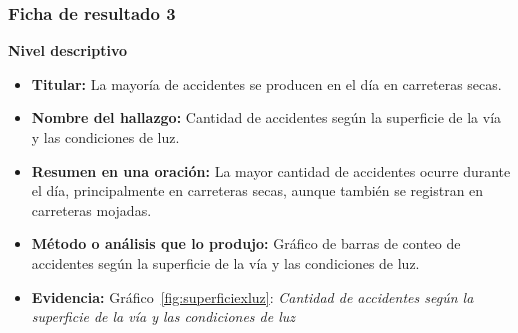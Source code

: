 \documentclass[12pt]{article}
\begin{document}
\subsubsection{Ficha de resultado 3}
\textbf{Nivel descriptivo} 
\begin{itemize}
    \item \textbf{Titular:}  La mayoría de accidentes se producen en el día en carreteras secas. 

    \item \textbf{Nombre del hallazgo:} Cantidad de accidentes según la superficie de la vía y las condiciones de luz. 

    \item \textbf{Resumen en una oración:} La mayor cantidad de accidentes ocurre durante el día,
    principalmente en carreteras secas, aunque también se registran en carreteras mojadas. \\

    \item \textbf{Método o análisis que lo produjo:}  Gráfico de barras de conteo
    de accidentes según la superficie de la vía y las condiciones de luz. \\

    \item \textbf{Evidencia:} Gráfico~\ref{fig:superficiexluz}: \textit{Cantidad
    de accidentes según la superficie de la vía y las condiciones de luz} \\

\end{itemize} 
\end{document}
